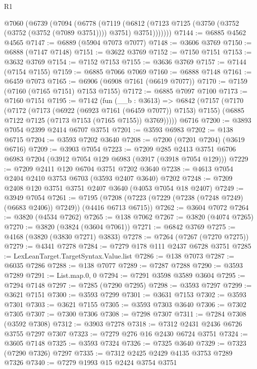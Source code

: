 \begin{lexlean}{R1}
\begin{coremodule}
    @7060
      (@6739
        (@7094
          (@6778
            (@7119
              (@6812 (@7123 @7125 (@3750 (@3752 (@3752 (@3752 (@7089 @3751)))) @3751) @3751)))))))
@7144 := @6885 @4562 @4565
@7147 := @6889 (@5904 @7073 @7077)
@7148 := @3606 @3769
@7150 := @6888 (@7147 @7148)
@7151 := @3622 @3769
@7152 := @7150 @7151
@7153 := @3632 @3769
@7154 := @7152 @7153
@7155 := @3636 @3769
@7157 := @7144 (@7154 @7155)
@7159 := @6885 @7066 @7069
@7160 := @6888 @7148
@7161 := @6459 @7073
@7165 := @6906 (@6908 @7161 (@6619 @7077))
@7170 := @7159 (@7160 (@7165 @7151) @7153 @7155)
@7172 := @6885 @7097 @7100
@7173 := @7160 @7151
@7195 := @7142
    (fun (__b : @3613) =>
    @6842
      (@7157
        (@7170
          (@7172
            (@7173 (@6922 (@6923 @7161 (@6459 @7077)) @7153) @7155)
            (@6885 @7122 @7125 (@7173 @7153 (@7165 @7155)) @3769)))))
    @6716
@7200 := @3893 @7054 @2399 @2414 @6707 @3751
@7201 := @3593 @6983
@7202 := @138 @6715
@7204 := @3593 @7202 @3640
@7208 := @7200 (@7201 @7204) (@3619 @6716)
@7209 := @3903 @7054
@7223 := @7209
    @285
    @2413
    @3751
    @6706
    @6983
    @7204
    (@3912 @7054 @129 @6983 (@3917 (@3918 @7054 @129)))
@7229 := @7209 @2411 @120 @6704 @3751 @7202 @3640
@7238 := @4613 @7054 @2404 @2410 @3753 @6703 (@3593 @2407 @3640) @7202
@7248 := @7209 @2408 @120 @3751 @3751 @2407 @3640 (@4053 @7054 @18 @2407)
@7249 := @3949 @7054
@7261 := @7195 (@7208 (@7223 (@7229 (@7238 (@7248 @7249) (@6683 @2406)) @7249)) (@4416 @6713 @6715))
@7262 := @3604 @7072
@7264 := @3820 (@4534 @7262)
@7265 := @138 @7062
@7267 := @3820 (@4074 @7265)
@7270 := @3820 (@3824 (@3604 @7061))
@7271 := @6842 @3769
@7275 := @4168 (@3820 (@3830 @7271) @3833)
@7278 := @7264 (@7267 (@7270 @7275))
@7279 := @4341 @7278
@7284 := @7279 @178 @111 @2437 @6728 @3751
@7285 := LexLeanTarget.TargetSyntax.Value.list
@7286 := @138 @7073
@7287 := @6035 @7286
@7288 := @138 @7077
@7289 := @7287 @7288
@7290 := @3593 @7289
@7291 := List.map.{0, 0}
@7294 := @7291 @3598 @3589 @3604
@7295 := @7294 @7148
@7297 := @7285 (@7290 @7295)
@7298 := @3593 @7297
@7299 := @3621 @7151
@7300 := @3593 @7299
@7301 := @3631 @7153
@7302 := @3593 @7301
@7303 := @3621 @7155
@7305 := @3593 @7303 @3640
@7306 := @7302 @7305
@7307 := @7300 @7306
@7308 := @7298 @7307
@7311 := @7284 @7308 (@3592 @7308)
@7312 := @3903 @7278
@7318 := @7312 @2431 @2436 @6726 @3755 @7297 @7307
@7323 := @7279 @276 @16 @2430 @6724 @3751
@7324 := @3605 @7148
@7325 := @3593 @7324
@7326 := @7325 @3640
@7329 := @7323 (@7290 @7326) @7297
@7335 := @7312 @2425 @2429 @4135 @3753 @7289 @7326
@7340 := @7279 @1993 @15 @2424 @3754 @3751

\end{coremodule}
\end{lexlean}
